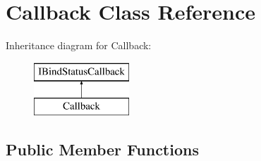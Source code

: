 \hypertarget{class_callback}{}\section{Callback Class Reference}
\label{class_callback}
Inheritance diagram for Callback\+:\begin{figure}[H]
\begin{center}
\leavevmode
\includegraphics[height=2.000000cm]{class_callback}
\end{center}
\end{figure}
\subsection*{Public Member Functions}
